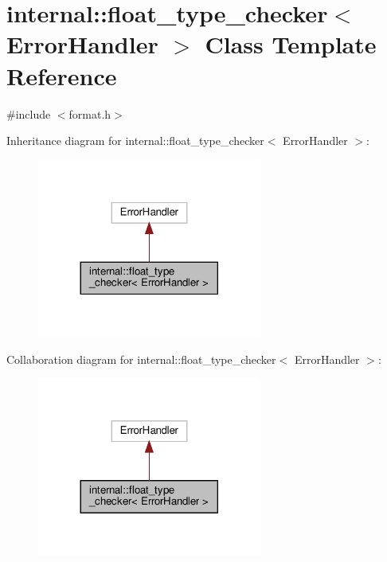 \hypertarget{classinternal_1_1float__type__checker}{}\section{internal\+:\+:float\+\_\+type\+\_\+checker$<$ Error\+Handler $>$ Class Template Reference}
\label{classinternal_1_1float__type__checker}


{\ttfamily \#include $<$format.\+h$>$}



Inheritance diagram for internal\+:\+:float\+\_\+type\+\_\+checker$<$ Error\+Handler $>$\+:
\nopagebreak
\begin{figure}[H]
\begin{center}
\leavevmode
\includegraphics[width=209pt]{classinternal_1_1float__type__checker__inherit__graph}
\end{center}
\end{figure}


Collaboration diagram for internal\+:\+:float\+\_\+type\+\_\+checker$<$ Error\+Handler $>$\+:
\nopagebreak
\begin{figure}[H]
\begin{center}
\leavevmode
\includegraphics[width=209pt]{classinternal_1_1float__type__checker__coll__graph}
\end{center}
\end{figure}
